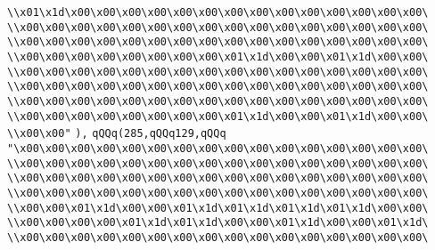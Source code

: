 \verb|\\x01\x1d\x00\x00\x00\x00\x00\x00\x00\x00\x00\x00\x00\x00\x00\x00\|\newline
\verb|\\x00\x00\x00\x00\x00\x00\x00\x00\x00\x00\x00\x00\x00\x00\x00\x00\|\newline
\verb|\\x00\x00\x00\x00\x00\x00\x00\x00\x00\x00\x00\x00\x00\x00\x00\x00\|\newline
\verb|\\x00\x00\x00\x00\x00\x00\x00\x00\x01\x1d\x00\x00\x01\x1d\x00\x00\|\newline
\verb|\\x00\x00\x00\x00\x00\x00\x00\x00\x00\x00\x00\x00\x00\x00\x00\x00\|\newline
\verb|\\x00\x00\x00\x00\x00\x00\x00\x00\x00\x00\x00\x00\x00\x00\x00\x00\|\newline
\verb|\\x00\x00\x00\x00\x00\x00\x00\x00\x00\x00\x00\x00\x00\x00\x00\x00\|\newline
\verb|\\x00\x00\x00\x00\x00\x00\x00\x00\x01\x1d\x00\x00\x01\x1d\x00\x00\|\newline
\verb|\\x00\x00"|\newline
\verb|),|\newline
\verb|qQQq(285,qQQq129,qQQq|\newline
\verb|"\x00\x00\x00\x00\x00\x00\x00\x00\x00\x00\x00\x00\x00\x00\x00\x00\|\newline
\verb|\\x00\x00\x00\x00\x00\x00\x00\x00\x00\x00\x00\x00\x00\x00\x00\x00\|\newline
\verb|\\x00\x00\x00\x00\x00\x00\x00\x00\x00\x00\x00\x00\x00\x00\x00\x00\|\newline
\verb|\\x00\x00\x00\x00\x00\x00\x00\x00\x00\x00\x00\x00\x00\x00\x00\x00\|\newline
\verb|\\x00\x00\x01\x1d\x00\x00\x01\x1d\x01\x1d\x01\x1d\x01\x1d\x00\x00\|\newline
\verb|\\x00\x00\x00\x00\x01\x1d\x01\x1d\x00\x00\x01\x1d\x00\x00\x01\x1d\|\newline
\verb|\\x00\x00\x00\x00\x00\x00\x00\x00\x00\x00\x00\x00\x00\x00\x00\x00\|\newline
